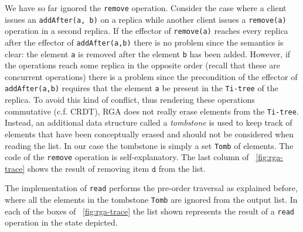 
We have so far ignored the \lstinline|remove| operation.
%
Consider the case where a client issues an \lstinline|addAfter(a, b)|
on a replica while another client issues a \lstinline|remove(a)|
operation in a second replica.
%
If the effector of \lstinline|remove(a)| reaches every replica after
the effector of \lstinline|addAfter(a,b)| there is no problem since
the semantics is clear: the element \lstinline|a| is removed after
the element \lstinline|b| has been added.
%
However, if the operations reach some replica in the opposite order
(recall that these are concurrent operations) there is a problem since
the precondition of the effector of \lstinline|addAfter(a,b)|
requires that the element \lstinline|a| be present in the
\lstinline|Ti-tree| of the replica.
%
To avoid this kind of conflict, thus rendering these operations
commutative (c.f. CRDT), RGA does not really erase elements from the
\lstinline|Ti-tree|.
%
Instead, an additional data structure called a \emph{tombstone} is used to
keep track of elements that have been conceptually erased and should
not be considered when reading the list.
%
In our case the tombstone is simply a set \lstinline|Tomb| of
elements.
%
The code of the \lstinline|remove| operation is self-explanatory.
%
The last column of \figureautorefname~\ref{fig:rga-trace} shows the result of
removing item $\mathtt{d}$ from the list.

The implementation of \lstinline|read| performs the pre-order
traversal as explained before, where all the elements in the tombstone
\lstinline|Tomb| are ignored from the output list.
%
In each of the boxes of \figureautorefname~\ref{fig:rga-trace} the list shown
represents the result of a \lstinline|read| operation in the state
depicted.


